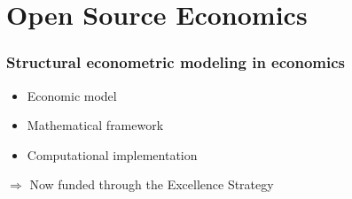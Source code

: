 \section{Open Source Economics}
\begin{frame}\frametitle{Structural econometric modeling in economics}

\vspace{0.3cm}\vspace{0.3cm}

	\begin{itemize}\setlength\itemsep{1em}
		\item Economic model
		\item Mathematical framework
		\item Computational implementation
	\end{itemize}\vspace{0.3cm}

\pause

$\Rightarrow$ Now funded through the \alert{Excellence Strategy}

\end{frame}

